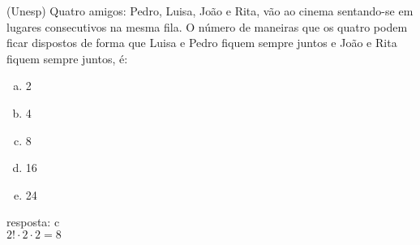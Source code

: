 \begin{ex}
 (Unesp) Quatro amigos: Pedro, Luisa, João e Rita, vão ao cinema sentando-se em  lugares consecutivos na mesma fila. O número de maneiras que os quatro podem ficar dispostos de forma que Luisa e Pedro fiquem sempre juntos e João e Rita fiquem sempre juntos, é:
    \begin{enumerate}[(a)]
    \item 2
    \item 4
    \item 8
    \item 16
    \item 24
    \end{enumerate}
     \begin{sol}
       resposta: c \\
       $2!\cdot2\cdot2=8$
     \end{sol}
\end{ex}